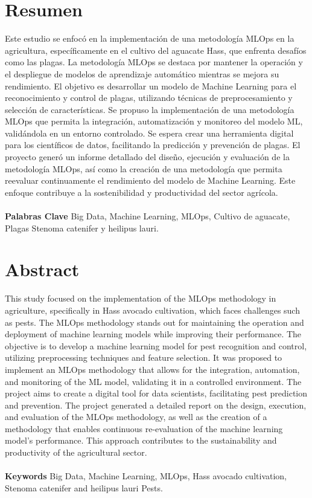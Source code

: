 \thispagestyle{empty}
\section*{Resumen}
Este estudio se enfocó en la implementación de una metodología MLOps en la agricultura, específicamente en el cultivo del aguacate Hass, que enfrenta desafíos como las plagas. La metodología MLOps se destaca por mantener la operación y el despliegue de modelos de aprendizaje automático mientras se mejora su rendimiento. El objetivo es desarrollar un modelo de Machine Learning para el reconocimiento y control de plagas, utilizando técnicas de preprocesamiento y selección de características. Se propuso la implementación de una metodología MLOps que permita la integración, automatización y monitoreo del modelo ML, validándola en un entorno controlado. Se espera crear una herramienta digital para los científicos de datos, facilitando la predicción y prevención de plagas. El proyecto generó un informe detallado del diseño, ejecución y evaluación de la metodología MLOps, así como la creación de una metodología que permita reevaluar continuamente el rendimiento del modelo de Machine Learning. Este enfoque contribuye a la sostenibilidad y productividad del sector agrícola.


\paragraph*{}{\textbf{Palabras Clave}} Big Data, Machine Learning, MLOps, Cultivo de
aguacate, Plagas Stenoma catenifer y heilipus lauri.

\section*{Abstract}
This study focused on the implementation of the MLOps methodology in agriculture, specifically in Hass avocado cultivation, which faces challenges such as pests. The MLOps methodology stands out for maintaining the operation and deployment of machine learning models while improving their performance. The objective is to develop a machine learning model for pest recognition and control, utilizing preprocessing techniques and feature selection. It was proposed to implement an MLOps methodology that allows for the integration, automation, and monitoring of the ML model, validating it in a controlled environment. The project aims to create a digital tool for data scientists, facilitating pest prediction and prevention. The project generated a detailed report on the design, execution, and evaluation of the MLOps methodology, as well as the creation of a methodology that enables continuous re-evaluation of the machine learning model's performance. This approach contributes to the sustainability and productivity of the agricultural sector.
\paragraph*{}{\textbf{Keywords}} Big Data, Machine Learning, MLOps, Hass avocado cultivation, Stenoma catenifer and heilipus lauri Pests.
